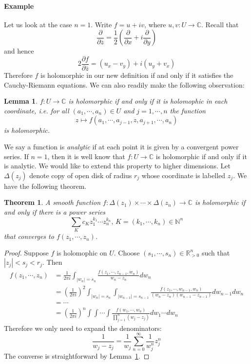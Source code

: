 \documentclass[12pt]{article}
\theoremstyle{plain}
\newtheorem{theorem}[equation]{Theorem}
\newtheorem{lemma}[equation]{Lemma}
\theoremstyle{definition}
\newcommand{\IC}{\mathbb{C}}
\newcommand{\IN}{\mathbb{N}}
\newcommand{\IR}{\mathbb{R}}
\newcommand{\<}{\langle}
\renewcommand{\>}{\rangle}
\newcommand{\p}{\partial}
\newcommand{\half}{\frac{1}{2}}
\newcommand{\bz}{\overline{z}}
\newcommand{\const}{\frac{1}{2\pi i}}
\begin{document}
\paragraph{Example} Let us look at the case $n = 1$. Write $f = u + iv$, where $u, v : U \to \IC$. Recall that 
$$ \frac{\p}{\p \bz} = \half( \frac{\p}{\p x} + i \frac{\p}{\p y}) $$ 
and hence 
$$ 2 \frac{\p f}{\p \bz} = (u_x - v_y) + i ( u_y + v_x ) $$
Therefore $f$ is holomorphic in our new definition if and only if it satisfies the Cauchy-Riemann equations. We can also readily make the following observation: 
\begin{lemma}
\label{regularcondition}
$f : U \to \IC$ is holomorphic if and only if it is holomophic in each coordinate, i.e. for all $(a_1, \cdots, a_n) \in U$ and $j = 1, \cdots, n$ the function 
$$ z \mapsto f(a_1, \cdots, a_{j - 1}, z, a_{j + 1}, \cdots, a_n) $$
is holomorphic. 
\end{lemma}

We say a function is \textit{analytic} if at each point it is given by a convergent power series. If $n = 1$, then it is well know that $f : U \to \IC$ is holomorphic if and only if it is analytic. We would like to extend this property to higher dimensions. Let $\Delta(z_j)$ denote copy of open disk of radius $r_j$ whose coordinate is labelled $z_j$. We have the following theorem. 

\begin{theorem}
A smooth function $f : \Delta(z_1) \times \cdots \times \Delta(z_n) \to \IC$ is holomorphic if and only if there is a power series 
$$ \sum_K c_K z_1^{k_1} \cdots z_n^{k_n}, \, K = (k_1, \cdots, k_n) \in \IN^n $$
that converges to $f(z_1, \cdots, z_n)$. 
\end{theorem}
\begin{proof}
Suppose $f$ is holomophic on $U$. Choose $(s_1, \cdots, s_n) \in \IR^n_{> 0}$ such that $|z_j| < s_j < r_j$. Then 
\begin{align*}
f(z_1, \cdots, z_n) &= \const  \int_{|w_n| = s_n} \frac{f(z_1, \cdots, z_{n-1}, w_n)}{w_n - z_n} dw_n \\
&= (\const)^2 \int_{|w_n| = s_n} \int_{|w_{n - 1}| = s_{n -1}} \frac{f(z_1, \cdots, w_{n-1}, w_n)}{(w_n - z_n)(w_{n - 1} - z_{n -1})} dw_{n-1} dw_n \\
&= \cdots \\
&= (\const)^n \int \int \cdots \int \frac{f(w_1, \cdots, w_n)}{\prod_{j = 1}^n ( w_j - z_j)} dw_1 \cdots dw_n
\end{align*}
Therefore we only need to expand the denominators: 
$$ \frac{1}{w_j - z_j} = \frac{1}{w_j} \sum_{n = 0}^\infty \frac{1}{w_j^n} z_j^n $$
The converse is straightforward by Lemma~\ref{regularcondition}. 
\end{proof}
\end{document}
